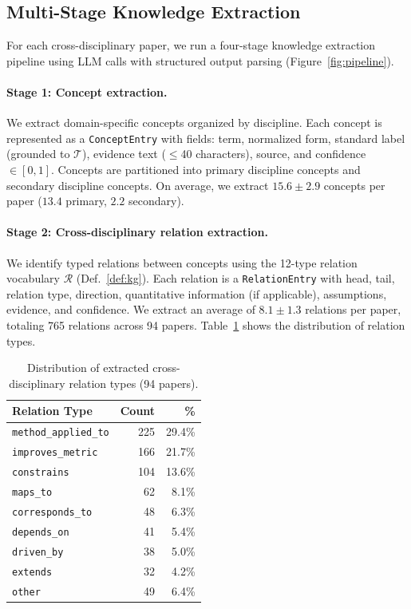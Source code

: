 \documentclass{article}
\begin{document}
\subsection{Multi-Stage Knowledge Extraction}
\label{sec:extraction}

For each cross-disciplinary paper, we run a four-stage knowledge extraction pipeline using LLM calls with structured output parsing (Figure~\ref{fig:pipeline}).

\paragraph{Stage 1: Concept extraction.}
We extract domain-specific concepts organized by discipline.
Each concept is represented as a \texttt{ConceptEntry} with fields: term, normalized form, standard label (grounded to $\mathcal{T}$), evidence text ($\leq$40 characters), source, and confidence $\in [0,1]$.
Concepts are partitioned into primary discipline concepts and secondary discipline concepts.
On average, we extract $15.6 \pm 2.9$ concepts per paper ($13.4$ primary, $2.2$ secondary).

\paragraph{Stage 2: Cross-disciplinary relation extraction.}
We identify typed relations between concepts using the 12-type relation vocabulary $\mathcal{R}$ (Def.~\ref{def:kg}).
Each relation is a \texttt{RelationEntry} with head, tail, relation type, direction, quantitative information (if applicable), assumptions, evidence, and confidence.
We extract an average of $8.1 \pm 1.3$ relations per paper, totaling 765 relations across 94 papers.
Table~\ref{tab:relation_dist} shows the distribution of relation types.

\begin{table}[t]
\centering
\caption{Distribution of extracted cross-disciplinary relation types (94 papers).}
\label{tab:relation_dist}
\small
\begin{tabular}{lrr}
\toprule
\textbf{Relation Type} & \textbf{Count} & \textbf{\%} \\
\midrule
\texttt{method\_applied\_to} & 225 & 29.4\% \\
\texttt{improves\_metric} & 166 & 21.7\% \\
\texttt{constrains} & 104 & 13.6\% \\
\texttt{maps\_to} & 62 & 8.1\% \\
\texttt{corresponds\_to} & 48 & 6.3\% \\
\texttt{depends\_on} & 41 & 5.4\% \\
\texttt{driven\_by} & 38 & 5.0\% \\
\texttt{extends} & 32 & 4.2\% \\
\texttt{other} & 49 & 6.4\% \\
\bottomrule
\end{tabular}
\end{table}
\end{document}

